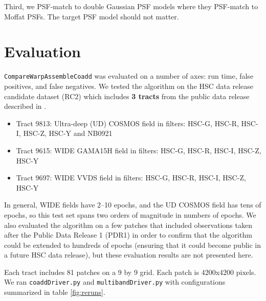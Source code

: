\documentclass[DM,authoryear,toc]{lsstdoc}
\begin{document}
Third, we PSF-match to double Gaussian PSF models where they PSF-match to Moffat PSFs.
The target PSF model should not matter.


\section{Evaluation}
\label{sec:evaluation}

\texttt{CompareWarpAssembleCoadd} was evaluated on a number of axes: run time, false positives, and false negatives.
We tested the algorithm on the HSC data release candidate dataset (RC2) which includes \textbf{3 tracts} from the public data release  described in \citet{2018PASJ...70S...5B}.

\begin{itemize}
\item Tract 9813: Ultra-deep (UD) COSMOS field  in filters: HSC-G, HSC-R, HSC-I, HSC-Z, HSC-Y and NB0921
\item Tract 9615: WIDE GAMA15H field  in filters: HSC-G, HSC-R, HSC-I, HSC-Z, HSC-Y
\item Tract 9697: WIDE VVDS field  in filters: HSC-G, HSC-R, HSC-I, HSC-Z, HSC-Y
\end{itemize}

In general, WIDE fields have 2--10 epochs, and the UD COSMOS field has tens of epochs, so this test set spans two orders of magnitude in numbers of epochs.
We also evaluated the algorithm on a few patches that included observations taken after the Public Data Release 1 (PDR1) in order to confirm that the algorithm could be extended to hundreds of epochs (ensuring that it could become public in a future HSC data release), but these evaluation results are not presented here.

Each tract includes 81 patches on a 9 by 9 grid.  Each patch is 4200x4200 pixels. We ran \texttt{coaddDriver.py} and \texttt{multibandDriver.py} with configurations summarized in table \ref{fig:reruns}.
\end{document}

